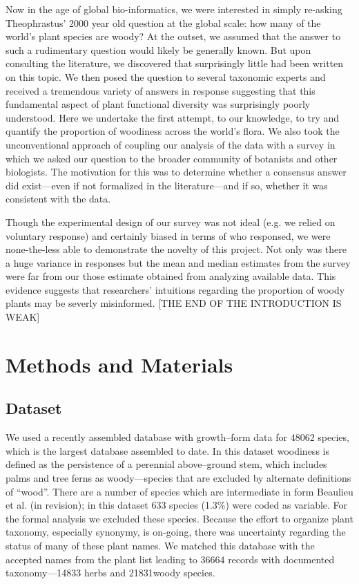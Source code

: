 \documentclass[12pt]{article}
\begin{document}

Now in the age of global bio-informatics, we were interested in simply re-asking Theophrastus' 2000 year old question at the global scale: how many of the world's plant species are woody? At the outset, we assumed that the answer to such a rudimentary question would likely be generally known. But upon consulting the literature, we discovered that surprisingly little had been written on this topic. We then posed the question to several taxonomic experts and received a tremendous variety of answers in response suggesting that this fundamental aspect of plant functional diversity was surprisingly poorly understood. Here we undertake the first attempt, to our knowledge, to try and quantify the proportion of woodiness across the world's flora. We also took the unconventional approach of coupling our analysis of the data with a survey in which we asked our question to the broader community of botanists and other biologists. The motivation for this was to determine whether a consensus answer did exist---even if not formalized in the literature---and if so, whether it was consistent with the data.

Though the experimental design of our survey was not ideal (e.g. we relied on voluntary response) and certainly biased in terms of who responsed, we were none-the-less able to demonstrate the novelty of this project. Not only was there a huge variance in responses but the mean and median estimates from the survey were far from our those estimate obtained from analyzing available data. This evidence suggests that researchers' intuitions regarding the proportion of woody plants may be severly misinformed. [THE END OF THE INTRODUCTION IS WEAK]

\section{Methods and Materials}

\subsection{Dataset}

We used a recently assembled database with growth--form data for 48062 species, which is the largest database assembled to date.  In this dataset woodiness is defined as the persistence of a perennial above--ground stem, which includes palms and tree ferns as woody---species that are excluded by alternate definitions of ``wood''.  There are a number of species which are intermediate in form Beaulieu et al. (in revision); in this dataset 633 species (1.3\%) were coded as variable.  For the formal analysis we excluded these species.  Because the effort to organize plant taxonomy, especially synonymy, is on-going, there was uncertainty regarding the status of many of these plant names.  We matched this database with the accepted names from the plant list leading to 36664 records with documented taxonomy---14833 herbs and 21831woody species.  
\end{document}

